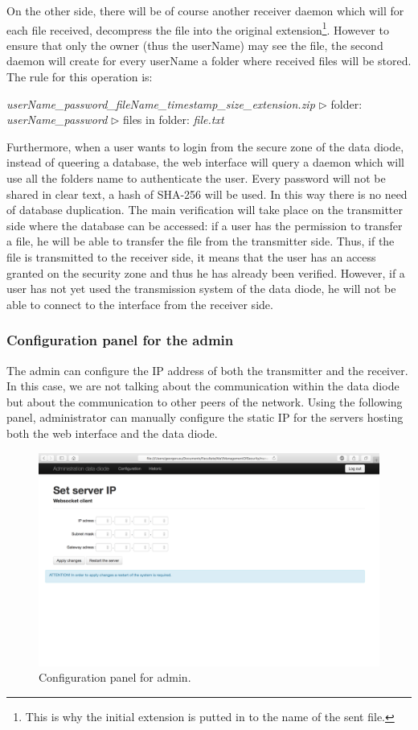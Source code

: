 \documentclass[a4paper,10pt]{article}
\begin{document}
On the other side, there will be of course another receiver daemon which will for each file received, decompress the file into the original extension\footnote{This is why the initial extension is putted in to the name of the sent file.}. However to ensure that only the owner (thus the userName) may see the file, the second daemon will create for every userName a folder where received files will be stored. The rule for this operation is:
\begin{center}
\centering
\emph{userName\_password\_fileName\_timestamp\_size\_extension.zip} $\triangleright$ folder: \emph{userName\_password} $\triangleright$ files in folder: \emph{file.txt}
\end{center}

Furthermore, when a user wants to login from the secure zone of the data diode, instead of queering a database, the web interface will query a daemon which will use all the folders name to authenticate the user. Every password will not be shared in clear text, a hash of SHA-256 will be used. In this way there is no need of database duplication. The main verification will take place on the transmitter side where the database can be accessed: if a user has the permission to transfer a file, he will be able to transfer the file from the transmitter side. Thus, if the file is transmitted to the receiver side, it means that the user has an access granted on the security zone and thus he has already been verified. However, if a user has not yet used the transmission system of the data diode, he will not be able to connect to the interface from the receiver side.

\subsubsection{Configuration panel for the admin}
The admin can configure the IP address of both the transmitter and the receiver. In this case, we are not talking about the communication within the data diode but about the communication to other peers of the network. Using the following panel, administrator can manually configure the static IP for the servers hosting both the web interface and the data diode.\bigskip

\begin{figure}[!h]
\centering
\includegraphics[scale=0.35]{images/admin-config.png}
\caption{Configuration panel for admin.}
\label{fig:configadminpage}
\end{figure}
\end{document}
